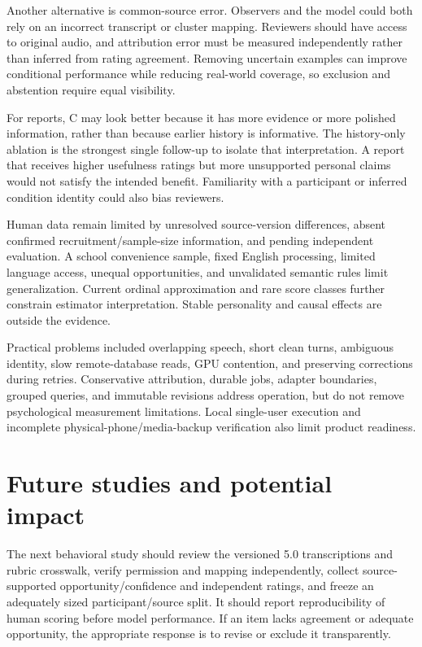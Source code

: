 \documentclass{article}
\begin{document}
Another alternative is common-source error. Observers and the model could both rely on an incorrect transcript or cluster mapping. Reviewers should have access to original audio, and attribution error must be measured independently rather than inferred from rating agreement. Removing uncertain examples can improve conditional performance while reducing real-world coverage, so exclusion and abstention require equal visibility.

For reports, C may look better because it has more evidence or more polished information, rather than because earlier history is informative. The history-only ablation is the strongest single follow-up to isolate that interpretation. A report that receives higher usefulness ratings but more unsupported personal claims would not satisfy the intended benefit. Familiarity with a participant or inferred condition identity could also bias reviewers.

Human data remain limited by unresolved source-version differences, absent confirmed recruitment/sample-size information, and pending independent evaluation. A school convenience sample, fixed English processing, limited language access, unequal opportunities, and unvalidated semantic rules limit generalization. Current ordinal approximation and rare score classes further constrain estimator interpretation. Stable personality and causal effects are outside the evidence.

Practical problems included overlapping speech, short clean turns, ambiguous identity, slow remote-database reads, GPU contention, and preserving corrections during retries. Conservative attribution, durable jobs, adapter boundaries, grouped queries, and immutable revisions address operation, but do not remove psychological measurement limitations. Local single-user execution and incomplete physical-phone/media-backup verification also limit product readiness.

\section{Future studies and potential impact}
The next behavioral study should review the versioned 5.0 transcriptions and rubric crosswalk, verify permission and mapping independently, collect source-supported opportunity/confidence and independent ratings, and freeze an adequately sized participant/source split. It should report reproducibility of human scoring before model performance. If an item lacks agreement or adequate opportunity, the appropriate response is to revise or exclude it transparently.
\end{document}
